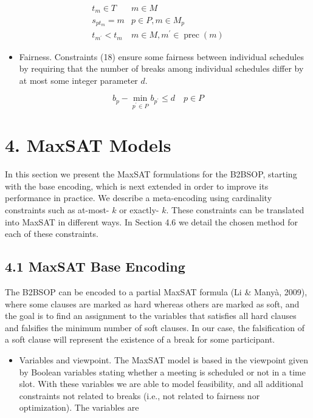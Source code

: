 \documentclass[10pt]{article}
\begin{document}
\[
\begin{array}{rl}
t_{m} \in T & m \in M \\
s_{p t_{m}}=m & p \in P, m \in M_{p} \\
t_{m^{\prime}}<t_{m} & m \in M, m^{\prime} \in \operatorname{prec}(m) \tag{17}
\end{array}
\]

\begin{itemize}
  \item Fairness. Constraints (18) ensure some fairness between individual schedules by requiring that the number of breaks among individual schedules differ by at most some integer parameter $d$.
\end{itemize}


\begin{equation*}
b_{p}-\min _{p^{\prime} \in P} b_{p^{\prime}} \leq d \quad p \in P \tag{18}
\end{equation*}


\section*{4. MaxSAT Models}
In this section we present the MaxSAT formulations for the B2BSOP, starting with the base encoding, which is next extended in order to improve its performance in practice. We describe a meta-encoding using cardinality constraints such as at-most- $k$ or exactly- $k$. These constraints can be translated into MaxSAT in different ways. In Section 4.6 we detail the chosen method for each of these constraints.

\subsection*{4.1 MaxSAT Base Encoding}
The B2BSOP can be encoded to a partial MaxSAT formula (Li \& Manyà, 2009), where some clauses are marked as hard whereas others are marked as soft, and the goal is to find an assignment to the variables that satisfies all hard clauses and falsifies the minimum number of soft clauses. In our case, the falsification of a soft clause will represent the existence of a break for some participant.

\begin{itemize}
  \item Variables and viewpoint. The MaxSAT model is based in the viewpoint given by Boolean variables stating whether a meeting is scheduled or not in a time slot. With these variables we are able to model feasibility, and all additional constraints not related to breaks (i.e., not related to fairness nor optimization). The variables are
\end{itemize}
\end{document}
